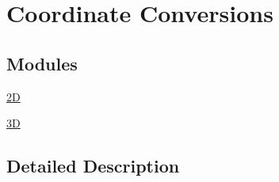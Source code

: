\hypertarget{group___e_g_x_math-_conversions-_coordinate_conversions}{}\section{Coordinate Conversions}
\label{group___e_g_x_math-_conversions-_coordinate_conversions}
\subsection*{Modules}
\begin{DoxyCompactItemize}
\item 
\mbox{\hyperlink{group___e_g_x_math-_conversions-_coordinate_conversions-2_d}{2D}}
\item 
\mbox{\hyperlink{group___e_g_x_math-_conversions-_coordinate_conversions-3_d}{3D}}
\end{DoxyCompactItemize}


\subsection{Detailed Description}
